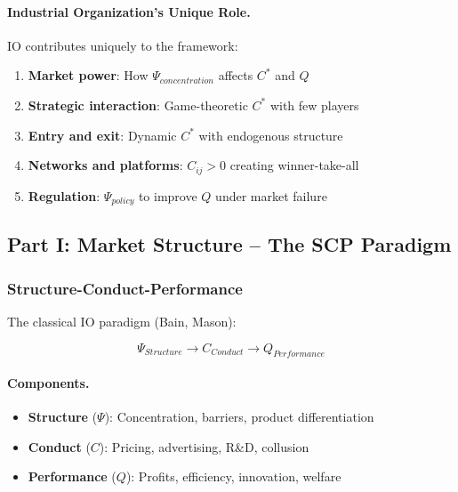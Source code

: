 \paragraph{Industrial Organization's Unique Role.}
IO contributes uniquely to the framework:
\begin{enumerate}
    \item \textbf{Market power}: How $\Psi_{concentration}$ affects $C^*$ and $Q$
    \item \textbf{Strategic interaction}: Game-theoretic $C^*$ with few players
    \item \textbf{Entry and exit}: Dynamic $C^*$ with endogenous structure
    \item \textbf{Networks and platforms}: $C_{ij} > 0$ creating winner-take-all
    \item \textbf{Regulation}: $\Psi_{policy}$ to improve $Q$ under market failure
\end{enumerate}

\subsection{Part I: Market Structure – The SCP Paradigm}

\subsubsection{Structure-Conduct-Performance}

The classical IO paradigm (Bain, Mason):

\begin{equation}
\boxed{
\Psi_{Structure} \to C_{Conduct} \to Q_{Performance}
}
\label{eq:scp}
\end{equation}

\paragraph{Components.}
\begin{itemize}
    \item \textbf{Structure} ($\Psi$): Concentration, barriers, product differentiation
    \item \textbf{Conduct} ($C$): Pricing, advertising, R\&D, collusion
    \item \textbf{Performance} ($Q$): Profits, efficiency, innovation, welfare
\end{itemize}

